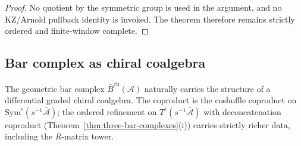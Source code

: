 \begin{proof}
No quotient by the symmetric group is used in the argument, and no
KZ/Arnold pullback identity is invoked. The theorem therefore remains
strictly ordered and finite-window complete.
\end{proof}

\subsection{Bar complex as chiral coalgebra}

\begin{theorem}\label{thm:bar-chiral}
The geometric bar complex $\bar{B}^{\text{ch}}(\mathcal{A})$ naturally carries the structure of a differential graded chiral coalgebra.
The coproduct is the coshuffle coproduct on $\mathrm{Sym}^c(s^{-1}\bar{\mathcal{A}})$; the ordered refinement on $T^c(s^{-1}\bar{\mathcal{A}})$ with deconcatenation coproduct (Theorem~\textup{\ref{thm:three-bar-complexes}}\textup{(i)}) carries strictly richer data, including the $R$-matrix tower.
\end{theorem}


